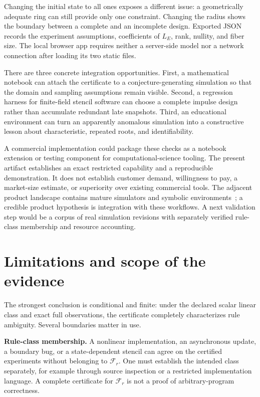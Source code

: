 \documentclass{ijuc}
\begin{document}
Changing the initial state to all ones exposes a different issue: a geometrically adequate ring can still provide only one constraint. Changing the radius shows the boundary between a complete and an incomplete design. Exported JSON records the experiment assumptions, coefficients of $L_E$, rank, nullity, and fiber size. The local browser app requires neither a server-side model nor a network connection after loading its two static files.

There are three concrete integration opportunities. First, a mathematical notebook can attach the certificate to a conjecture-generating simulation so that the domain and sampling assumptions remain visible. Second, a regression harness for finite-field stencil software can choose a complete impulse design rather than accumulate redundant late snapshots. Third, an educational environment can turn an apparently anomalous simulation into a constructive lesson about characteristic, repeated roots, and identifiability.

A commercial implementation could package these checks as a notebook extension or testing component for computational-science tooling. The present artifact establishes an exact restricted capability and a reproducible demonstration. It does not establish customer demand, willingness to pay, a market-size estimate, or superiority over existing commercial tools. The adjacent product landscape contains mature simulators and symbolic environments~\cite{golly,sage,wolfram}; a credible product hypothesis is integration with these workflows. A next validation step would be a corpus of real simulation revisions with separately verified rule-class membership and resource accounting.

\section{Limitations and scope of the evidence}
The strongest conclusion is conditional and finite: under the declared scalar linear class and exact full observations, the certificate completely characterizes rule ambiguity. Several boundaries matter in use.

\textbf{Rule-class membership.} A nonlinear implementation, an asynchronous update, a boundary bug, or a state-dependent stencil can agree on the certified experiments without belonging to $\mathcal F_r$. One must establish the intended class separately, for example through source inspection or a restricted implementation language. A complete certificate for $\mathcal F_r$ is not a proof of arbitrary-program correctness.
\end{document}
